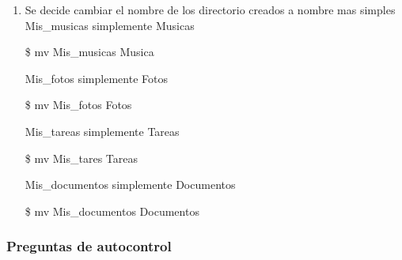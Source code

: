 \documentclass[a4paper,12pt,spanish]{article}
\begin{document}
\begin{enumerate}
\item Se decide cambiar el nombre de los directorio creados a nombre mas simples\\
  Mis\_musicas  simplemente  Musicas\\
  \begin{tcolorbox}[colback=gray!5]
    \$ mv  Mis\_musicas  Musica
  \end{tcolorbox}

  Mis\_fotos  simplemente Fotos\\
  \begin{tcolorbox}[colback=gray!5]
    \$ mv  Mis\_fotos  Fotos
  \end{tcolorbox}
  Mis\_tareas simplemente Tareas\\
  \begin{tcolorbox}[colback=gray!5]
    \$ mv  Mis\_tares  Tareas
  \end{tcolorbox}
  Mis\_documentos simplemente Documentos\\
  \begin{tcolorbox}[colback=gray!5]
    \$ mv  Mis\_documentos  Documentos
  \end{tcolorbox}
  

  
  



    
 \end{enumerate}



\newpage
\subsubsection{Preguntas de autocontrol}
\label{sec:preg-de-autoc-2}
\end{document}
